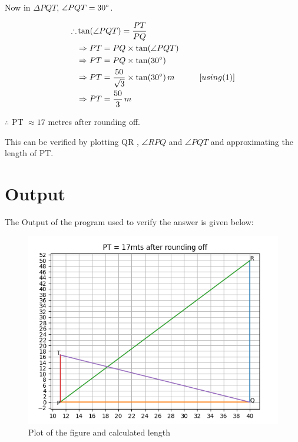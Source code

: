 \documentclass[twocoloumn]{article}
\begin{document}
\begin{multicols}{2}
Now in $\Delta PQT$, $\angle PQT = 30\degree$.

\begin{align*}
\therefore &\tan(\angle PQT) = \frac{PT}{PQ} \\
&\Rightarrow PT = PQ \times \tan(\angle PQT)\\
&\Rightarrow PT = PQ \times \tan(30 \degree)\\
&\Rightarrow PT = \frac{50}{\sqrt{3}} \times \tan(30 \degree) \, m \hspace{30pt}[using (1)]\\
&\Rightarrow PT = \frac{50}{3}\, m
\end{align*}

\noindent $\therefore$ PT  $ \approx 17 $ metres after rounding off.

\vspace{2pt}
\noindent This can be verified by plotting QR , $\angle RPQ$ and $\angle PQT$ and approximating 
\noindent the length of PT.
\end{multicols}

\pagebreak

\section*{Output}
\noindent The Output of the program used to verify the answer is given below:

\begin{figure}[h]
\includegraphics[width=\textwidth]{output.png}
\caption{Plot of the figure and calculated length}

\end{figure}
\end{document}
